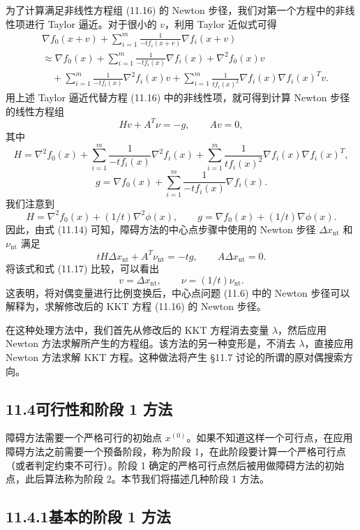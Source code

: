 \documentclass[UTF8,12pt,a4paper,fontset=fandol]{ctexart}
\begin{document}
为了计算满足非线性方程组 (11.16) 的 Newton 步径，我们对第一个方程中的非线性项进行 Taylor 逼近。对于很小的 $v$，利用 Taylor 近似式可得
\[
\begin{aligned}
&\nabla f_0(x+v)+\sum_{i=1}^m\frac{1}{-tf_i(x+v)}\nabla f_i(x+v)\\
&\approx \nabla f_0(x)+\sum_{i=1}^m\frac{1}{-tf_i(x)}\nabla f_i(x)+\nabla^2 f_0(x)v\\
&\quad +\sum_{i=1}^m\frac{1}{-tf_i(x)}\nabla^2 f_i(x)v
+\sum_{i=1}^m\frac{1}{tf_i(x)^2}\nabla f_i(x)\nabla f_i(x)^Tv.
\end{aligned}
\]
用上述 Taylor 逼近代替方程 (11.16) 中的非线性项，就可得到计算 Newton 步径的线性方程组
\begin{equation}
Hv+A^T\nu=-g,\qquad Av=0,
\tag{11.17}
\end{equation}
其中
\[
H=\nabla^2 f_0(x)+\sum_{i=1}^m\frac{1}{-tf_i(x)}\nabla^2 f_i(x)+\sum_{i=1}^m\frac{1}{tf_i(x)^2}\nabla f_i(x)\nabla f_i(x)^T,
\]
\[
g=\nabla f_0(x)+\sum_{i=1}^m\frac{1}{-tf_i(x)}\nabla f_i(x).
\]
我们注意到
\[
H=\nabla^2 f_0(x)+(1/t)\nabla^2\phi(x),\qquad
g=\nabla f_0(x)+(1/t)\nabla\phi(x).
\]
因此，由式 (11.14) 可知，障碍方法的中心点步骤中使用的 Newton 步径 $\Delta x_{\mathrm{nt}}$ 和 $\nu_{\mathrm{nt}}$ 满足
\[
tH\Delta x_{\mathrm{nt}}+A^T\nu_{\mathrm{nt}}=-tg,\qquad A\Delta x_{\mathrm{nt}}=0.
\]
将该式和式 (11.17) 比较，可以看出
\[
v=\Delta x_{\mathrm{nt}},\qquad \nu=(1/t)\nu_{\mathrm{nt}}.
\]
这表明，将对偶变量进行比例变换后，中心点问题 (11.6) 中的 Newton 步径可以解释为，求解修改后的 KKT 方程 (11.16) 的 Newton 步径。

在这种处理方法中，我们首先从修改后的 KKT 方程消去变量 $\lambda$，然后应用 Newton 方法求解所产生的方程组。该方法的另一种变形是，不消去 $\lambda$，直接应用 Newton 方法求解 KKT 方程。这种做法将产生 \S11.7 讨论的所谓的原对偶搜索方向。

\subsection*{11.4\quad 可行性和阶段 1 方法}

障碍方法需要一个严格可行的初始点 $x^{(0)}$。如果不知道这样一个可行点，在应用障碍方法之前需要一个预备阶段，称为阶段 1，在此阶段要计算一个严格可行点（或者判定约束不可行）。阶段 1 确定的严格可行点然后被用做障碍方法的初始点，此后算法称为阶段 2。本节我们将描述几种阶段 1 方法。

\subsection*{11.4.1\quad 基本的阶段 1 方法}
\end{document}
